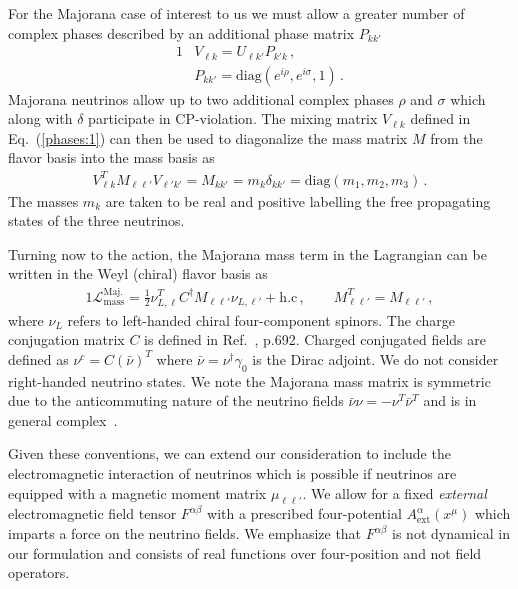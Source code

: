 \documentclass[addchapnum]{ws-rv961x669} %
\newcommand{\req}[1]{Eq.~(\ref{#1})}
\begin{document}
For the Majorana case of interest to us we must allow a greater number of complex phases described by an additional phase matrix $P_{kk'}$
\begin{alignat}{1}
	\label{phases:1} &V_{\ell k} = U_{\ell k'}P_{k'k}\,,\\
	\label{phases:3} &P_{kk'} = \mathrm{diag}(e^{i\rho},e^{i\sigma},1)\,.
\end{alignat}
Majorana neutrinos allow up to two additional complex phases $\rho$ and $\sigma$ which along with $\delta$ participate in CP-violation. The mixing matrix $V_{\ell k}$ defined in \req{phases:1} can then be used to diagonalize the mass matrix $M$ from the flavor basis into the mass basis as
\begin{align}
    \label{diag:1}
    V_{\ell k}^{T}M_{\ell\ell'}V_{\ell'k'} = M_{kk'} = m_{k}\delta_{kk'} = \mathrm{diag}(m_{1},m_{2},m_{3})\,.
\end{align}
The masses $m_{k}$ are taken to be real and positive labelling the free propagating states of the three neutrinos.

Turning now to the action, 
the Majorana mass term in the Lagrangian can be written in the Weyl (chiral) flavor basis as
\begin{alignat}{1}
	\label{mass:1} \mathcal{L}_{\mathrm{mass}}^{\mathrm{Maj.}}=\frac{1}{2}\nu_{L,\ell}^{T}C^{\dag}M_{\ell\ell'}\nu_{L,\ell'}+\mathrm{h.c}\,,\qquad
    M_{\ell\ell'}^{T}=M_{\ell\ell'}\,,
\end{alignat}
where $\nu_{L}$ refers to left-handed chiral four-component spinors. The charge conjugation matrix $C$ is defined in Ref.~\citeauthor{Itzykson:1980rh}, p.692. Charged conjugated fields are defined as $\nu^{c}=C(\bar\nu)^{T}$ where $\bar\nu=\nu^{\dag}\gamma_{0}$ is the Dirac adjoint. We do not consider right-handed neutrino states. We note the Majorana mass matrix is symmetric due to the anticommuting nature of the neutrino fields $\bar\nu\nu=-\nu^{T}\bar\nu^{T}$ and is in general complex~\cite{Adhikary:2013bma}.

Given these conventions, we can extend our consideration to include the electromagnetic interaction of neutrinos which is possible if neutrinos are equipped with a magnetic moment matrix $\mu_{\ell\ell'}$. We allow for a fixed \emph{external} electromagnetic field tensor $F^{\alpha\beta}$ with a prescribed four-potential $A^{\alpha}_\mathrm{ext}(x^{\mu})$ which imparts a force on the neutrino fields. We emphasize that $F^{\alpha\beta}$ is not dynamical in our formulation and consists of real functions over four-position and not field operators.
\end{document}
